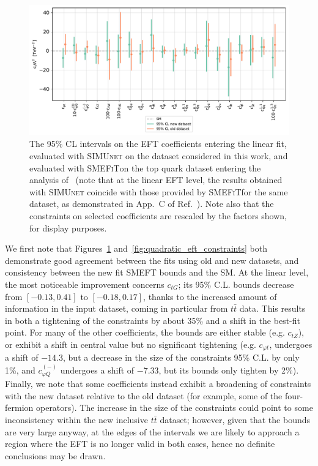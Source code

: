 \documentclass[withindex,glossary]{cam-thesis}
\newcommand{\simunet}{\textsc{SIMUnet}}
\newcommand{\smefit}{\textsc{SMEFiT}}
\begin{document}
\begin{figure}[tb!]
	\centering
	\includegraphics[scale=0.7]{smeft_plots/smeft_lin_nlo_comparison.pdf}
	\caption{The 95\% CL intervals on the EFT coefficients entering the linear fit,
          evaluated with \simunet{} on the dataset considered in this work, and evaluated with \smefit on the
          top quark dataset entering the analysis of~\cite{Ethier:2021bye} 
          (note that at the linear EFT level, the results obtained with \simunet{}
          coincide with those provided by \smefit for the same dataset, as demonstrated in
          App.~C of Ref.~\cite{Kassabov:2023hbm}).
         Note also that the constraints on selected coefficients 
          are rescaled by the factors shown, for display purposes.
	  }
	\label{fig:linear_eft_constraints}
\end{figure}

We first note that Figures~\ref{fig:linear_eft_constraints} and~\ref{fig:quadratic_eft_constraints} both
demonstrate good agreement between the fits using old and new datasets,
and consistency between the new fit SMEFT bounds and the SM.
At the linear level, the most noticeable improvement concerns $c_{tG}$; its
 95\% C.L. bounds decrease from $[-0.13, 0.41]$ to $[-0.18, 0.17]$,
 thanks to the increased amount of information in the input dataset,
 coming in particular from $t \bar{t}$ data. This results in both a 
 tightening of the constraints by about 35\% and a shift in the best-fit point. 
%
For many of the other coefficients, the bounds are either stable
(e.g. $c_{tZ}$), or exhibit a shift in central value but no significant tightening (e.g. $c_{\varphi t}$, undergoes
a shift of $-14.3$, but a decrease in the size of the constraints 95\%
C.L. by only 1\%, and $c_{\varphi Q}^{(-)}$ undergoes a shift of
$-7.33$, but its bounds only tighten by 2\%). Finally, we note that some coefficients instead exhibit a broadening of constraints with the new dataset relative to the old
dataset (for example, some of the four-fermion operators). The increase in the size of the constraints could point to some
inconsistency within the new inclusive $t\bar{t}$ dataset; however, given that the bounds are very large anyway, at the edges of the 
intervals we are likely to approach a region where the EFT is no
longer valid in both cases, hence no definite conclusions may be
drawn. 
\end{document}
